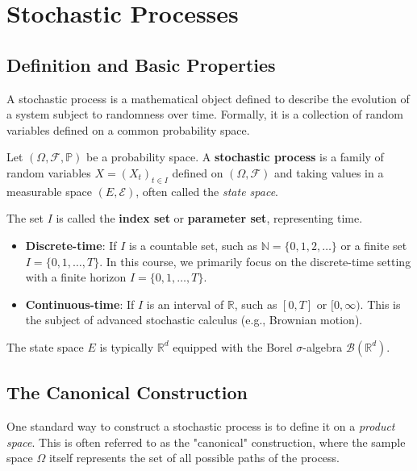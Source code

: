 \chapter{Stochastic Processes}

\section{Definition and Basic Properties}

A stochastic process is a mathematical object defined to describe the evolution of a system subject to randomness over time. Formally, it is a collection of random variables defined on a common probability space.

\begin{definition}
Let $(\Omega, \mathcal{F}, \mathbb{P})$ be a probability space. A \textbf{stochastic process} is a family of random variables $X = (X_t)_{t \in I}$ defined on $(\Omega, \mathcal{F})$ and taking values in a measurable space $(E, \mathcal{E})$, often called the \textit{state space}.
\end{definition}

The set $I$ is called the \textbf{index set} or \textbf{parameter set}, representing time.
\begin{itemize}
    \item \textbf{Discrete-time}: If $I$ is a countable set, such as $\mathbb{N} = \{0, 1, 2, \dots\}$ or a finite set $I = \{0, 1, \dots, T\}$. In this course, we primarily focus on the discrete-time setting with a finite horizon $I = \{0, 1, \dots, T\}$.
    \item \textbf{Continuous-time}: If $I$ is an interval of $\mathbb{R}$, such as $[0, T]$ or $[0, \infty)$. This is the subject of advanced stochastic calculus (e.g., Brownian motion).
\end{itemize}

The state space $E$ is typically $\mathbb{R}^d$ equipped with the Borel $\sigma$-algebra $\mathcal{B}(\mathbb{R}^d)$.

\section{The Canonical Construction}

One standard way to construct a stochastic process is to define it on a \textit{product space}. This is often referred to as the "canonical" construction, where the sample space $\Omega$ itself represents the set of all possible paths of the process.

